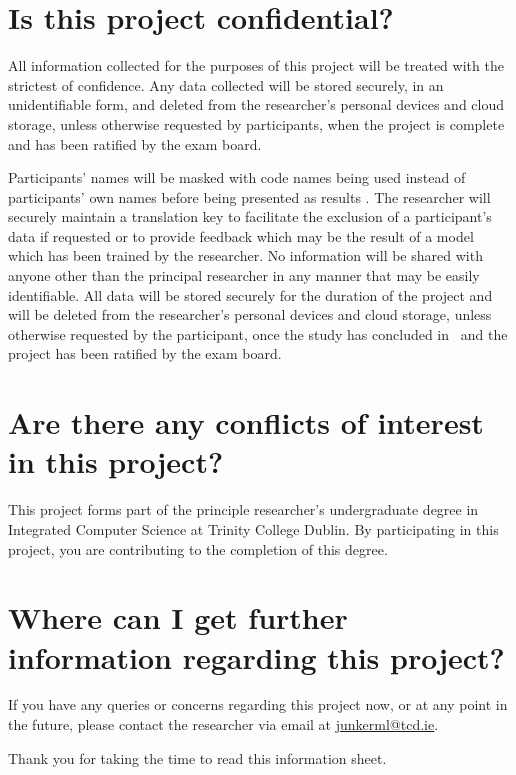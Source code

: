 \section*{Is this project confidential?}
All information collected for the purposes of this project will be treated with the strictest of confidence. Any data collected will be stored securely, in an unidentifiable form, and deleted from the researcher's personal devices and cloud storage, unless otherwise requested by participants, when the project is complete and has been ratified by the exam board.

Participants' names will be masked with code names being used instead of participants' own names before being presented as results . The researcher will securely maintain a translation key to facilitate the exclusion of a participant's data if requested or to provide feedback which may be the result of a model which has been trained by the researcher. No information will be shared with anyone other than the principal researcher in any manner that may be easily identifiable. All data will be stored securely for the duration of the project and will be deleted from the researcher's personal devices and cloud storage, unless otherwise requested by the participant, once the study has concluded in \deadline~and the project has been ratified by the exam board.
\section*{Are there any conflicts of interest in this project?}
This project forms part of the principle researcher's undergraduate degree in Integrated Computer Science at Trinity College Dublin. By participating in this project, you are contributing to the completion of this degree.
\section*{Where can I get further information regarding this project?}
If you have any queries or concerns regarding this project now, or at any point in the future, please contact the researcher via email at \href{mailto:junkerml@tcd.ie}{junkerml@tcd.ie}.

\vspace{1cm}

Thank you for taking the time to read this information sheet.

